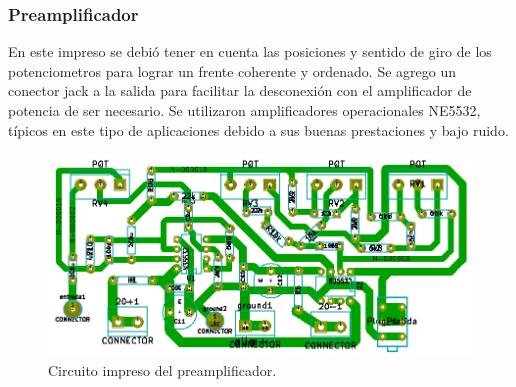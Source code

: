 \subsubsection{Preamplificador}

En este impreso se debió tener en cuenta las posiciones y sentido de giro de los potenciometros para lograr un frente coherente y ordenado. Se agrego un conector jack a la salida para facilitar la desconexión con el amplificador de potencia de ser necesario.
Se utilizaron amplificadores operacionales NE5532, típicos en este tipo de aplicaciones debido a sus buenas prestaciones y bajo ruido.

\begin{figure}[H]
\centering
\centerline{\includegraphics[width=1\textwidth]{img/pre_pcb.png}}
\caption{Circuito impreso del preamplificador.}
\label{pre_pcb} 
\end{figure}